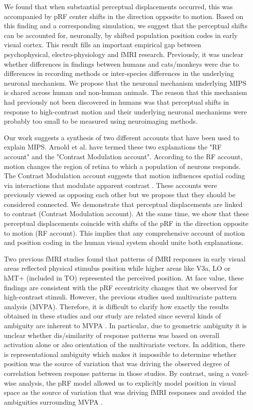 We found that when substantial perceptual displacements occurred, this was accompanied by pRF center shifts in the direction opposite to motion. Based on this finding and a corresponding simulation, we suggest that the perceptual shifts can be accounted for, neuronally, by shifted population position codes in early visual cortex. This result fills an important empirical gap between psychophysical, electro-physiology and fMRI research. Previously, it was unclear whether differences in findings between humans and cats/monkeys were due to differences in recording methods or inter-species differences in the underlying neuronal mechanism. We propose that the neuronal mechanism underlying MIPS is shared across human and non-human animals. The reason that this mechanism had previously not been discovered in humans was that perceptual shifts in response to high-contrast motion and their underlying neuronal mechanisms were probably too small to be measured using neuroimaging methods.

Our work suggests a synthesis of two different accounts that have been used to explain MIPS. Arnold et al. \parencite*{Arnold2007} have termed these two explanations the "RF account" and the "Contrast Modulation account". According to the RF account, motion changes the region of retina to which a population of neurons responds. The Contrast Modulation account suggests that motion influences spatial coding via interactions that modulate apparent contrast \parencite{Arnold2007}. These accounts were previously viewed as opposing each other but we propose that they should be considered connected. We demonstrate that perceptual displacements are linked to contrast (Contrast Modulation account). At the same time, we show that these perceptual displacements coincide with shifts of the pRF in the direction opposite to motion (RF account). This implies that any comprehensive account of motion and position coding in the human visual system should unite both explanations. 

Two previous fMRI studies \parencite{Fischer2011, Maus2013} found that patterns of fMRI responses in early visual areas reflected physical stimulus position while higher areas like V3a, LO or hMT+ (included in TO) represented the perceived position. At face value, these findings are consistent with the pRF eccentricity changes that we observed for high-contrast stimuli. However, the previous studies used multivariate pattern analysis (MVPA). Therefore, it is difficult to clarify how exactly the results obtained in these studies and our study are related since several kinds of ambiguity are inherent to MVPA \parencite{Naselaris2015a}. In particular, due to geometric ambiguity it is unclear whether dis/similarity of response patterns was based on overall activation alone or also orientation of the multivariate vectors. In addition, there is representational ambiguity which makes it impossible to determine whether position was the source of variation that was driving the observed degree of correlation between response patterns in those studies. By contrast, using a voxel-wise analysis, the pRF model allowed us to explicitly model position in visual space as the source of variation that was driving fMRI responses and avoided the ambiguities surrounding MVPA \parencite{Naselaris2015a}. 

